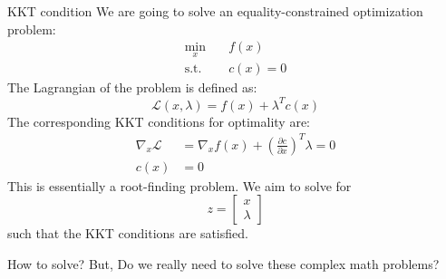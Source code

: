 \documentclass{beamer}
\begin{document}
\begin{frame}{KKT condition}
\footnotesize
We are going to solve an equality-constrained optimization problem:
\[
\begin{aligned}
\min_x \quad & f(x) \\
\text{s.t.} \quad & c(x) = 0
\end{aligned}
\]
\vspace{0.5em}
The Lagrangian of the problem is defined as:
\[
\mathcal{L}(x,\lambda) = f(x) + \lambda^T c(x)
\]
The corresponding KKT conditions for optimality are:
\[
\begin{aligned}
\nabla_x \mathcal{L} &= \nabla_x f(x) + \left( \frac{\partial c}{\partial x} \right)^T \lambda = 0 \\
c(x) &= 0
\end{aligned}
\]
\vspace{0.5em}
This is essentially a \alert{root-finding problem}. We aim to solve for
\[
z = \begin{bmatrix} x \\ \lambda \end{bmatrix}
\]
such that the KKT conditions are satisfied.
\end{frame}

\begin{frame}{How to solve?}
\big
But, Do we really need to solve these complex math problems?

\end{frame}
\end{document}
